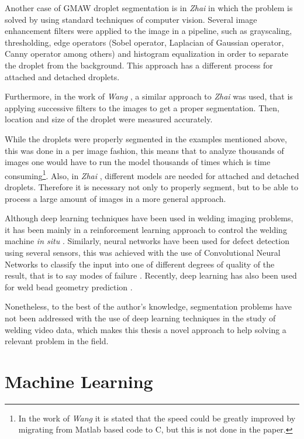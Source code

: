 Another case of GMAW droplet segmentation is in \textit{Zhai} \cite{Zhai} in which the problem is solved by using standard techniques of computer vision. Several image enhancement filters were applied to the image in a pipeline, such as grayscaling, thresholding, edge operators (Sobel operator, Laplacian of Gaussian operator, Canny operator among others) and histogram equalization in order to separate the droplet from the background. This approach has a different process for attached and detached droplets. 

Furthermore, in the work of \textit{Wang} \cite{wang}, a similar approach to \textit{Zhai} \cite{Zhai} was used, that is applying successive filters to the images to get a proper segmentation. Then, location and size of the droplet were measured accurately.

While the droplets were properly segmented in the examples mentioned above, this was done in a per image fashion, this means that to analyze thousands of images one would have to run the model thousands of times which is time consuming\footnote{In the work of \textit{Wang} \cite{wang} it is stated that the speed could be greatly improved by migrating from Matlab based code to C, but this is not done in the paper.}. Also, in \textit{Zhai} \cite{Zhai}, different models are needed for attached and detached droplets. Therefore it is necessary not only to properly segment, but to be able to process a large amount of images in a more general approach.

Although deep learning techniques have been used in welding imaging problems, it has been mainly in a reinforcement learning approach to control the welding machine \textit{in situ} \cite{Gunther}. Similarly, neural networks have been used for defect detection using several sensors, this was achieved with the use of Convolutional Neural Networks to classify the input into one of different degrees of quality of the result, that is to say modes of failure \cite{Zhang}. Recently, deep learning has also been used for weld bead geometry prediction \cite{bead}.

Nonetheless, to the best of the author's knowledge, segmentation problems have not been addressed with the use of deep learning techniques in the study of welding video data, which makes this thesis a novel approach to help solving a relevant problem in the field.

\section{Machine Learning}

